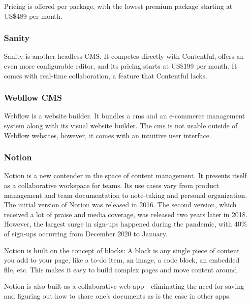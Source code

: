 Pricing is offered per package, with the lowest premium package starting at US\$489 per month.

\subsubsection{Sanity}


Sanity is another headless CMS.
It competes directly with Contentful, offers an even more configurable editor, and its pricing starts at US\$199 per month.
It comes with real-time collaboration, a feature that Contentful lacks.

\subsubsection{Webflow CMS}


Webflow is a website builder.
It bundles a \acrshort{cms} and an e-commerce management system along with its visual website builder.
The \acrshort{cms} is not usable outside of Webflow websites, however, it comes with an intuitive user interface.

\subsubsection{Notion}


Notion is a new contender in the space of content management.
It presents itself as a collaborative workspace for teams.
Its use cases vary from product management and team documentation to note-taking and personal organization.
The initial version of Notion was released in 2016.
The second version, which received a lot of praise and media coverage, was released two years later in 2018.
However, the largest surge in sign-ups happened during the pandemic, with 40\% of sign-ups occurring from December 2020 to January.

Notion is built on the concept of blocks: A block is any single piece
of content you add to your page, like a to-do item, an image, a code
block, an embedded file, etc.
This makes it easy to build complex pages and move content around.

Notion is also built as a collaborative web app---eliminating the need
for saving and figuring out how to share one's documents as is the case in other apps.

